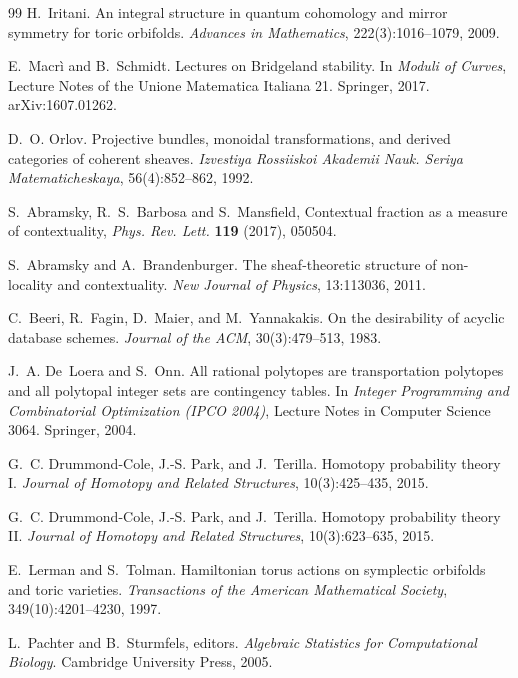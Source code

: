 \documentclass[11pt]{article}
\theoremstyle{definition}
\theoremstyle{remark}
\begin{document}
\begin{thebibliography}{99}
H.~Iritani.
\newblock An integral structure in quantum cohomology and mirror symmetry for toric orbifolds.
\newblock \emph{Advances in Mathematics}, 222(3):1016--1079, 2009.

E.~Macr\`i and B.~Schmidt.
\newblock Lectures on {B}ridgeland stability.
\newblock In \emph{Moduli of Curves}, Lecture Notes of the Unione Matematica Italiana 21. Springer,
2017. arXiv:1607.01262.

D.~O. Orlov.
\newblock Projective bundles, monoidal transformations, and derived categories of coherent sheaves.
\newblock \emph{Izvestiya Rossiiskoi Akademii Nauk. Seriya Matematicheskaya}, 56(4):852--862, 1992.

S.~Abramsky, R.~S.~Barbosa and S.~Mansfield, Contextual fraction as a measure of contextuality, \emph{Phys. Rev.
Lett.} \textbf{119} (2017), 050504.

S.~Abramsky and A.~Brandenburger.
\newblock The sheaf-theoretic structure of non-locality and contextuality.
\newblock \emph{New Journal of Physics}, 13:113036, 2011.

C.~Beeri, R.~Fagin, D.~Maier, and M.~Yannakakis.
\newblock On the desirability of acyclic database schemes.
\newblock \emph{Journal of the ACM}, 30(3):479--513, 1983.

J.~A. De~Loera and S.~Onn.
\newblock All rational polytopes are transportation polytopes and all polytopal integer sets are contingency
tables.
\newblock In \emph{Integer Programming and Combinatorial Optimization (IPCO 2004)}, Lecture Notes in Computer
Science 3064. Springer, 2004.

G.~C. Drummond-Cole, J.-S. Park, and J.~Terilla.
\newblock Homotopy probability theory {I}.
\newblock \emph{Journal of Homotopy and Related Structures}, 10(3):425--435, 2015.

G.~C. Drummond-Cole, J.-S. Park, and J.~Terilla.
\newblock Homotopy probability theory {II}.
\newblock \emph{Journal of Homotopy and Related Structures}, 10(3):623--635, 2015.

E.~Lerman and S.~Tolman.
\newblock Hamiltonian torus actions on symplectic orbifolds and toric varieties.
\newblock \emph{Transactions of the American Mathematical Society}, 349(10):4201--4230, 1997.

L.~Pachter and B.~Sturmfels, editors.
\newblock \emph{Algebraic Statistics for Computational Biology}.
\newblock Cambridge University Press, 2005.


\end{thebibliography}
\end{document}
